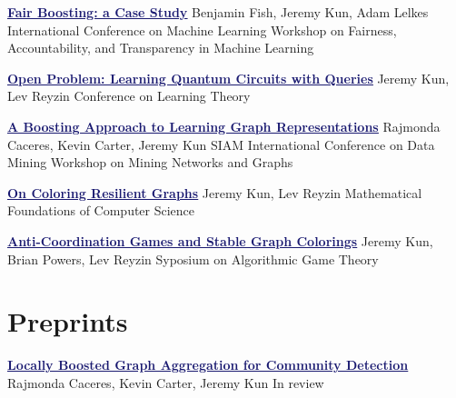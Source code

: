 \documentclass[11pt]{moderncv}
\begin{document}
         {\href{http://www.fatml.org/papers/Fish_Kun_Lelkes.pdf}{\textcolor{MidnightBlue}{\underline{\textbf{Fair Boosting: a Case Study}}}}}
      {Benjamin Fish, Jeremy Kun, Adam Lelkes}
      {International Conference on Machine Learning Workshop on Fairness, Accountability, and Transparency in Machine Learning}
      {}
      {}

         {\href{http://jmlr.org/proceedings/papers/v40/Kun15.html}{\textcolor{MidnightBlue}{\underline{\textbf{Open Problem: Learning Quantum Circuits with Queries}}}}}
      {Jeremy Kun, Lev Reyzin}
      {Conference on Learning Theory}
      {}
      {}

         {\href{http://arxiv.org/abs/1401.3258}{\textcolor{MidnightBlue}{\underline{\textbf{A Boosting Approach to Learning Graph Representations}}}}}
      {Rajmonda Caceres, Kevin Carter, Jeremy Kun}
      {SIAM International Conference on Data Mining Workshop on Mining Networks and Graphs}
      {}
      {}

         {\href{http://arxiv.org/abs/1402.4376}{\textcolor{MidnightBlue}{\underline{\textbf{On Coloring Resilient Graphs}}}}}
      {Jeremy Kun, Lev Reyzin}
      {Mathematical Foundations of Computer Science}
      {}
      {}

         {\href{http://arxiv.org/abs/1308.3258}{\textcolor{MidnightBlue}{\underline{\textbf{Anti-Coordination Games and Stable Graph Colorings}}}}}
      {Jeremy Kun, Brian Powers, Lev Reyzin}
      {Syposium on Algorithmic Game Theory}
      {}
      {}


   \section{Preprints}
         \cventry{}
         {\href{http://arxiv.org/abs/1405.3210}{\textcolor{MidnightBlue}{\underline{\textbf{Locally Boosted Graph Aggregation for Community Detection}}}}}
      {}
      {Rajmonda Caceres, Kevin Carter, Jeremy Kun}
      {}
      {In review}
\end{document}

